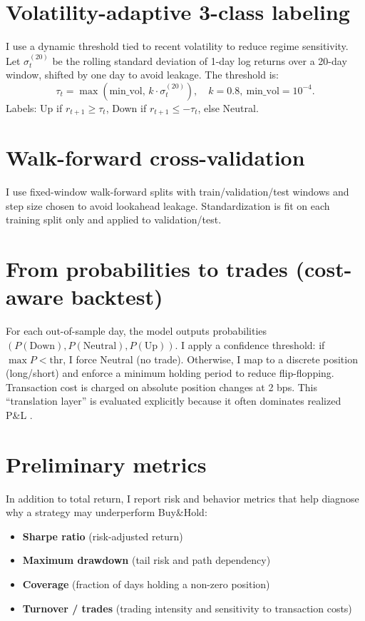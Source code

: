 \documentclass[12pt,a4paper,oneside]{report}
\begin{document}
\section{Volatility-adaptive 3-class labeling}
I use a dynamic threshold tied to recent volatility to reduce regime sensitivity. Let $\sigma^{(20)}_t$ be the rolling standard deviation of 1-day log returns over a 20-day window, shifted by one day to avoid leakage. The threshold is:
\[
\tau_t=\max(\text{min\_vol},\,k\cdot\sigma_{t}^{(20)}),\quad k=0.8,\ \text{min\_vol}=10^{-4}.
\]
Labels: Up if $r_{t+1}\ge \tau_t$, Down if $r_{t+1}\le -\tau_t$, else Neutral.

\section{Walk-forward cross-validation}
I use fixed-window walk-forward splits with train/validation/test windows and step size chosen to avoid lookahead leakage. Standardization is fit on each training split only and applied to validation/test.

\section{From probabilities to trades (cost-aware backtest)}
For each out-of-sample day, the model outputs probabilities $(P(\text{Down}),P(\text{Neutral}),P(\text{Up}))$. I apply a confidence threshold: if $\max P < \text{thr}$, I force Neutral (no trade). Otherwise, I map to a discrete position (long/short) and enforce a minimum holding period to reduce flip-flopping. Transaction cost is charged on absolute position changes at 2 bps. This ``translation layer'' is evaluated explicitly because it often dominates realized P\&L \citep{bailey2014,lopezdeprado2018}.

\section{Preliminary metrics}
In addition to total return, I report risk and behavior metrics that help diagnose why a strategy may underperform Buy\&Hold:
\begin{itemize}
  \item \textbf{Sharpe ratio} (risk-adjusted return)
  \item \textbf{Maximum drawdown} (tail risk and path dependency)
  \item \textbf{Coverage} (fraction of days holding a non-zero position)
  \item \textbf{Turnover / trades} (trading intensity and sensitivity to transaction costs)
\end{itemize}
\end{document}
